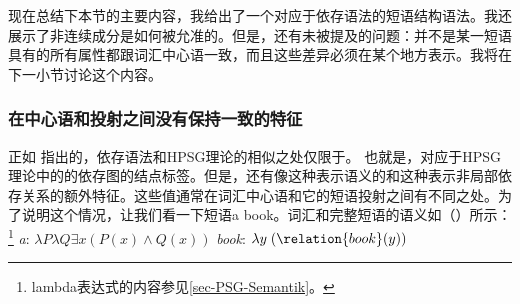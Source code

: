 现在总结下本节的主要内容，我给出了一个对应于依存语法的短语结构语法。我还展示了非连续成分是如何被允准的。但是，还有未被提及的问题：并不是某一短语具有的所有属性都跟词汇中心语一致，而且这些差异必须在某个地方表示。我将在下一小节讨论这个内容。

\subsubsection{在中心语和投射之间没有保持一致的特征}
\label{sec-dg-daughters-mothers}
\label{sec-dg-is-simpler}
%
正如 \citet{Oliva2003a}指出的，依存语法和HPSG理论的相似之处仅限于\headvsc。
也就是，对应于HPSG理论中的\headvsc 的依存图的结点标签。但是，还有像\contc 这种表示语义的和\slaschc 这种表示非局部依存关系的额外特征。这些值通常在词汇中心语和它的短语投射之间有不同之处。为了说明这个情况，让我们看一下短语a book。词汇和完整短语的语义如（）所示：\footnote{lambda表达式的内容参见\ref{sec-PSG-Semantik}。}
\eal
\ex \emph{a}: $\lambda P \lambda Q \exists x (P(x) \wedge Q(x))$
\ex \emph{book}: $\lambda y\;(\relation{book}(y))$
